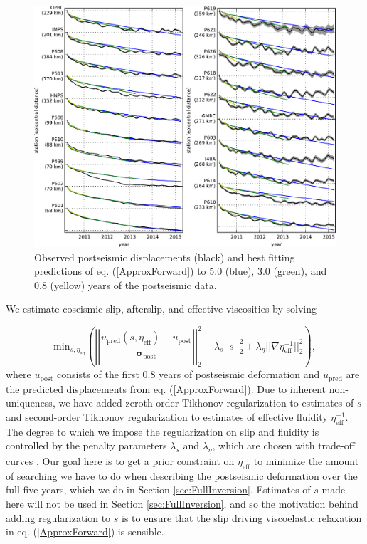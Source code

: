 \documentclass[draft,linenumbers]{AGUJournal}
\providecommand{\DIFadd}[1]{{\protect\color{blue}\uwave{#1}}} %
\providecommand{\DIFdel}[1]{{\protect\color{red}\sout{#1}}}                      %
\providecommand{\DIFaddbegin}{} %
\providecommand{\DIFaddend}{} %
\providecommand{\DIFdelbegin}{} %
\providecommand{\DIFdelend}{} %
\providecommand{\DIFaddbeginFL}{} %
\providecommand{\DIFaddendFL}{} %
\providecommand{\DIFdelbeginFL}{} %
\providecommand{\DIFdelendFL}{} %
\begin{document}
\begin{figure}
\DIFdelbeginFL %
\DIFdelendFL \DIFaddbeginFL \includegraphics[scale=0.9]{Figures/2016jb013114-p10}
\DIFaddendFL \centering 
\caption{Observed postseismic displacements (black) and best fitting predictions of eq. (\ref{ApproxForward}) to 5.0 (blue), 3.0 (green), and 0.8 (yellow) years of the postseismic data.} 
\label{fig:RecordSection1}
\end{figure}

We estimate coseismic slip, afterslip, and effective viscosities by solving 

\begin{equation}\label{ObjectiveFunction}
 \mathrm{min}_{s,\eta_\mathrm{eff}} \left(\left|\left|
 \frac{u_\mathrm{pred}(s,\eta_\mathrm{eff}) - u_\mathrm{post}}
 {\mathbf{\sigma_\mathrm{post}}}\right|\right|_2^2 + 
 \lambda_s||s||_2^2 + 
 \lambda_\eta||\nabla \eta_{\mathrm{eff}}^{-1}||_2^2\right),
\end{equation} 
where $u_\mathrm{post}$ consists of the first 0.8 years of postseismic deformation and $u_\mathrm{pred}$ are the predicted displacements from eq. (\ref{ApproxForward}).  Due to inherent non-uniqueness, we have added zeroth-order Tikhonov regularization to estimates of $s$ and second-order Tikhonov regularization to estimates of effective fluidity $\eta_\mathrm{eff}^{-1}$. The degree to which we impose the regularization on slip and fluidity is controlled by the penalty parameters $\lambda_s$ and $\lambda_\eta$, which are chosen with trade-off curves \DIFaddbegin \DIFadd{(Figure S1)}\DIFaddend .  Our goal \DIFdelbegin \DIFdel{here }\DIFdelend is to get a prior constraint on $\eta_{\mathrm{eff}}$ to minimize the amount of searching we have to do when describing the postseismic deformation over the full five years, which we do in Section \ref{sec:FullInversion}.  Estimates of $s$ made here will not be used in Section \ref{sec:FullInversion}, and so the motivation behind adding regularization to $s$ is to ensure that the slip driving viscoelastic relaxation in eq. (\ref{ApproxForward}) is sensible.  
\end{document}
